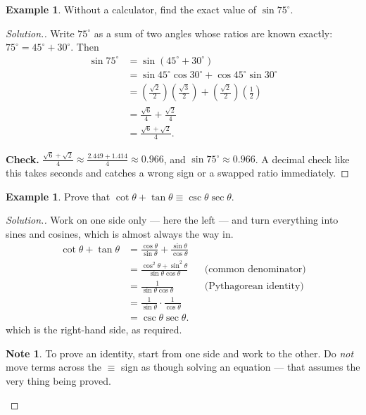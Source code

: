 \documentclass[11pt,a4paper]{article}
\theoremstyle{definition}
\newtheorem{example}[thm]{Example}
\newtheorem{note}[thm]{Note}
\newenvironment{solution}
  {\renewcommand{\qedsymbol}{}\begin{proof}[\textit{Solution}.]}
  {\end{proof}}
\begin{document}
\begin{example}
Without a calculator, find the exact value of $\sin 75^\circ$.
\end{example}

\begin{solution}
Write $75^\circ$ as a sum of two angles whose ratios are known exactly:
$75^\circ=45^\circ+30^\circ$. Then
\begin{align*}
\sin 75^\circ &=\sin(45^\circ+30^\circ)\\
&=\sin 45^\circ\cos 30^\circ+\cos 45^\circ\sin 30^\circ\\
&=\left(\frac{\sqrt{2}}{2}\right)\left(\frac{\sqrt{3}}{2}\right)
 +\left(\frac{\sqrt{2}}{2}\right)\left(\frac{1}{2}\right)\\
&=\frac{\sqrt{6}}{4}+\frac{\sqrt{2}}{4}\\
&=\frac{\sqrt{6}+\sqrt{2}}{4}.
\end{align*}

\textbf{Check.} $\frac{\sqrt6+\sqrt2}{4}\approx\frac{2.449+1.414}{4}\approx 0.966$, and
$\sin 75^\circ\approx 0.966$. A decimal check like this takes seconds and catches a
wrong sign or a swapped ratio immediately.
\end{solution}

\begin{example}
Prove that $\cot\theta+\tan\theta\equiv\csc\theta\sec\theta$.
\end{example}

\begin{solution}
Work on one side only --- here the left --- and turn everything into sines and cosines,
which is almost always the way in.
\begin{align*}
\cot\theta+\tan\theta
&=\frac{\cos\theta}{\sin\theta}+\frac{\sin\theta}{\cos\theta}\\
&=\frac{\cos^2\theta+\sin^2\theta}{\sin\theta\cos\theta}
&&\text{(common denominator)}\\
&=\frac{1}{\sin\theta\cos\theta}
&&\text{(Pythagorean identity)}\\
&=\frac{1}{\sin\theta}\cdot\frac{1}{\cos\theta}\\
&=\csc\theta\sec\theta.
\end{align*}
which is the right-hand side, as required.

\begin{note}
To prove an identity, start from one side and work to the other. Do \emph{not} move
terms across the $\equiv$ sign as though solving an equation --- that assumes the very
thing being proved.
\end{note}
\end{solution}
\end{document}
